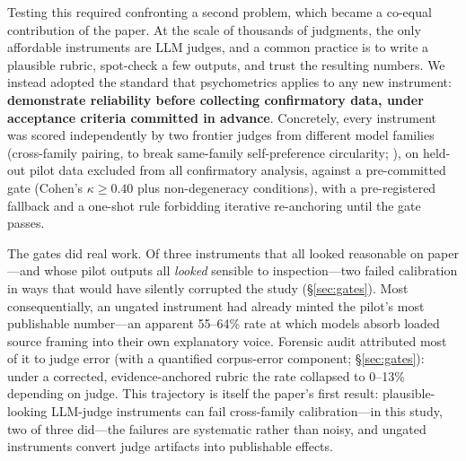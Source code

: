 \documentclass{article}
\newcommand{\kap}{\kappa}
\begin{document}
Testing this required confronting a second problem, which became a
co-equal contribution of the paper. At the scale of thousands of judgments,
the only affordable instruments are LLM judges, and a common practice
is to write a plausible rubric, spot-check a few outputs, and
trust the resulting numbers. We instead adopted the standard that
psychometrics applies to any new instrument: \textbf{demonstrate
reliability before collecting confirmatory data, under acceptance criteria
committed in advance}. Concretely, every instrument was scored
independently by two frontier judges from different model families
(cross-family pairing, to break same-family self-preference circularity;
\citealp{panickssery2024selfpreference}), on held-out pilot
data excluded from all confirmatory analysis, against a pre-committed gate
(Cohen's $\kap \ge 0.40$ plus non-degeneracy conditions), with a
pre-registered fallback and a one-shot rule forbidding iterative
re-anchoring until the gate passes.

The gates did real work. Of three instruments that all looked reasonable on
paper---and whose pilot outputs all \emph{looked} sensible to
inspection---two failed calibration in ways that would have silently
corrupted the study (\S\ref{sec:gates}). Most consequentially, an ungated
instrument had already minted the pilot's most publishable number---an
apparent 55--64\% rate at which models absorb loaded source framing into
their own explanatory voice. Forensic audit attributed most of it to
judge error (with a quantified corpus-error component; \S\ref{sec:gates}):
under a corrected, evidence-anchored rubric the rate collapsed to
0--13\% depending on judge. This trajectory is itself the paper's first result:
plausible-looking LLM-judge instruments
can fail cross-family calibration---in this study, two of three did---the
failures are systematic
rather than noisy, and ungated instruments convert judge artifacts into
publishable effects.
\end{document}

